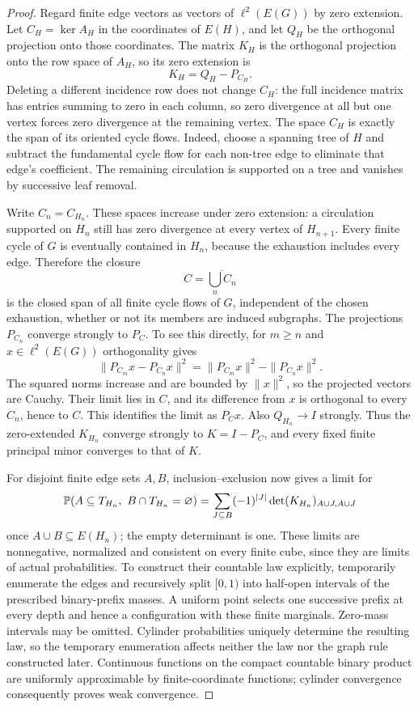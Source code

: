 \begin{proof}
Regard finite edge vectors as vectors of $\ell^2(E(G))$ by zero extension.
Let $C_H=\ker A_H$ in the coordinates of $E(H)$, and let $Q_H$ be the
orthogonal projection onto those coordinates. The matrix $K_H$ is the
orthogonal projection onto the row space of $A_H$, so its zero extension is
\begin{equation}\label{eq:finite-cycle-projection}
 K_H=Q_H-P_{C_H}.
\end{equation}
Deleting a different incidence row does not change $C_H$: the full
incidence matrix has entries summing to zero in each column, so zero
divergence at all but one vertex
forces zero divergence at the remaining vertex. The space $C_H$ is exactly
the span of its oriented cycle flows. Indeed, choose a spanning tree of
$H$ and subtract the fundamental cycle flow for each non-tree edge to
eliminate that edge's coefficient. The remaining circulation is supported
on a tree and vanishes by successive leaf removal.

Write $C_n=C_{H_n}$. These spaces increase under zero extension: a
circulation supported on $H_n$ still has zero divergence at every vertex
of $H_{n+1}$. Every finite cycle of $G$ is eventually contained in $H_n$,
because the exhaustion includes every edge. Therefore the closure
\[
 C=\overline{\bigcup_n C_n}
\]
is the closed span of all finite cycle flows of $G$, independent of the
chosen exhaustion, whether or not its members are induced subgraphs.
The projections $P_{C_n}$ converge strongly to $P_C$. To see this directly,
for $m\ge n$ and $x\in\ell^2(E(G))$ orthogonality gives
\[
 \|P_{C_m}x-P_{C_n}x\|^2
 =\|P_{C_m}x\|^2-\|P_{C_n}x\|^2.
\]
The squared norms increase and are bounded by $\|x\|^2$, so the projected
vectors are Cauchy. Their limit lies in $C$, and its difference from $x$
is orthogonal to every $C_n$, hence to $C$. This identifies the limit as
$P_Cx$. Also $Q_{H_n}\to I$ strongly. Thus the zero-extended $K_{H_n}$
converge strongly to $K=I-P_C$, and every fixed finite principal minor
converges to that of $K$.

For disjoint finite edge sets $A,B$, inclusion--exclusion now gives a limit
for
\[
 \P(A\subseteq T_{H_n},\ B\cap T_{H_n}=\varnothing)
 =\sum_{J\subseteq B}(-1)^{|J|}
       \det(K_{H_n})_{A\cup J,A\cup J}
\]
once $A\cup B\subseteq E(H_n)$; the empty determinant is one.
These limits are nonnegative, normalized and consistent on every finite
cube, since they are limits of actual probabilities. To construct their
countable law explicitly, temporarily enumerate the edges and recursively
split $[0,1)$ into half-open intervals of the prescribed binary-prefix
masses. A uniform point selects one successive prefix at every depth and
hence a configuration with these finite marginals. Zero-mass intervals
may be omitted. Cylinder probabilities uniquely determine the resulting
law, so the temporary enumeration affects neither the law nor the graph
rule constructed later. Continuous functions on the compact countable
binary product are uniformly approximable by finite-coordinate functions;
cylinder convergence consequently proves weak convergence.


\end{proof}

